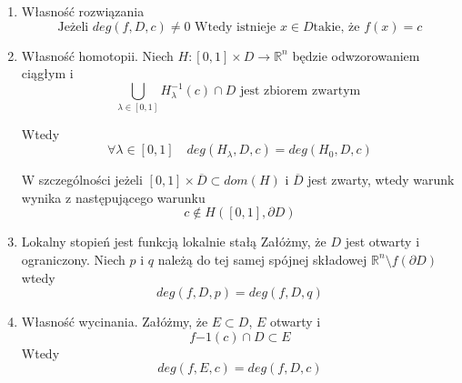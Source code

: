 \begin{enumerate}
 \item Własność rozwiązania \newline
   \begin{equation}
   \mbox{Jeżeli  }  deg(f,D,c) \neq 0  \mbox{ Wtedy istnieje } x \in D  \mbox{takie, że }  f(x) = c 
   \end{equation}
   
  \item Własność homotopii.  \newline
  Niech $ H : [0,1] \times D \to \mathbb R^n $ będzie odwzorowaniem ciągłym i 
  \begin{equation} \label{eq:homotopy}
    \bigcup_{\lambda \in [0,1] } H^{-1}_{\lambda }(c) \cap D \mbox{ jest zbiorem zwartym }
  \end{equation}

  Wtedy 
  \begin{equation}
      \forall \lambda \in [0,1] \quad deg(H_{\lambda},D,c) = deg(H_0,D,c) 
  \end{equation}
  
  W szczególności jeżeli $ [0,1] \times \overline{D} \subset dom(H) $ i $ \overline{D} $ jest zwarty, wtedy warunk wynika z następującego warunku
  \begin{equation}
    c \notin H([0,1], \partial{D})
  \end{equation}
  
  \item Lokalny stopień jest funkcją lokalnie stałą \newline
    Załóżmy, że $ D $ jest otwarty i ograniczony. Niech $p $ i $ q $ należą do tej samej spójnej składowej $ \mathbb R^n  \setminus f(\partial{D}) $  wtedy
    \begin{equation} \label{eq:locallity}
      deg(f,D,p) = deg(f,D,q)
    \end{equation}
  
  \item Własność wycinania. \newline
    Załóżmy, że $ E \subset D $, $ E $ otwarty i 
    \begin{equation}
	f{-1}(c) \cap D \subset E 
    \end{equation}
    Wtedy
    \begin{equation}
        deg(f,E,c) = deg(f,D,c)
    \end{equation}
    

\end{enumerate}
